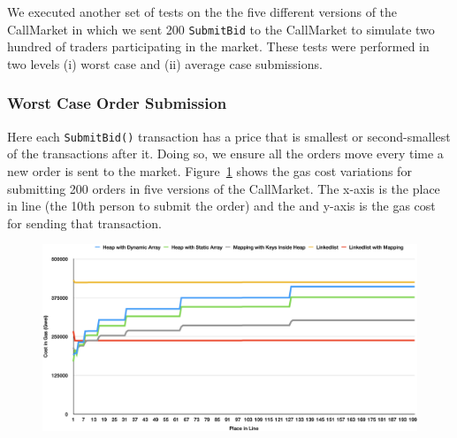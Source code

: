 We executed another set of tests on the the five different versions of the CallMarket in which we sent 200 \texttt{SubmitBid} to the CallMarket to simulate two hundred of traders participating in the market. These tests were performed in two levels (i) worst case and (ii) average case submissions. 


\subsubsection{Worst Case Order Submission}

Here each \texttt{SubmitBid()} transaction has a price that is smallest or second-smallest of the transactions after it. Doing so, we ensure all the orders move every time a new order is sent to the market. Figure~\ref{fig:worst_case_submission} shows the gas cost variations for submitting 200 orders in five versions of the CallMarket. The x-axis is the place in line (\eg the 10th person to submit the order) and the and y-axis is the gas cost for sending that transaction.



\begin{figure}[htb!p]
\centering
\includegraphics[width=1\textwidth]{fig/worst_case_submission_3.png}
\caption{\footnotesize{}  \label{fig:worst_case_submission}}
\end{figure}

